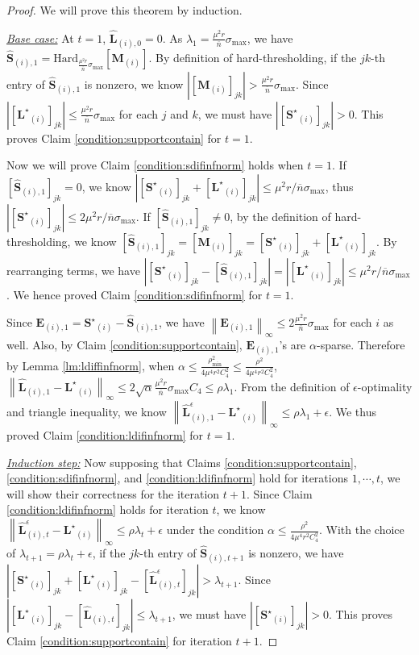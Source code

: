\documentclass[twoside,11pt]{article}
\newcommand{\abs}[1]{\left\vert #1\right\vert}
\newcommand{\norm}[1]{\left\lVert#1\right\rVert}
\newcommand{\hard}[2]{\text{Hard}_{#1}\left[#2\right]}
\newcommand{\matE}{\mathbf{E}}
\newcommand{\matLst}{{\mathbf{L}^\star}}
\newcommand{\matM}{\mathbf{M}}
\newcommand{\matSst}{{\mathbf{S}^\star}}
\newcommand{\hmatL}{\hat{\mathbf{L}}}
\newcommand{\hmatLeps}{\hat{\mathbf{L}}^{\epsilon}}
\newcommand{\hmatS}{\hat{\mathbf{S}}}
\newcommand{\gop}{\sigma_{\max}}
\newcommand{\bn}{{\overline{n}}}
\newcommand{\rhom}{\rho_{\min}}
\begin{document}
\begin{proof}
We will prove this theorem by induction.\vspace{1mm}

\noindent \underline{\it Base case:}
At $t=1$, $\hmatL_{(i),0}=0$. As $\lambda_1=\frac{\mu^2 r}{\bn}\gop$, we have  $\hmatS_{(i),1}=\hard{\frac{\mu^2 r}{\bn}\gop}{\matM_{(i)}}$. By definition of hard-thresholding, if the $jk$-th entry of $\hmatS_{(i),1}$ is nonzero, we know $\abs{[\matM_{(i)}]_{jk}}> \frac{\mu^2 r}{\bn}\gop$. Since $\abs{[\matLst_{(i)}]_{jk}}\le \frac{\mu^2 r}{\bn}\gop$ for each $j$ and $k$, we must have $\abs{[\matSst_{(i)}]_{jk}}>0$. This proves Claim \ref{condition:supportcontain} for $t=1$.

Now we will prove Claim \ref{condition:sdifinfnorm} holds when $t=1$. If $[\hmatS_{(i),1}]_{jk}= 0$, we know $\abs{[\matSst_{(i)}]_{jk}+[\matLst_{(i)}]_{jk}}\le \mu^2r/\bn \gop$, thus $\abs{[\matSst_{(i)}]_{jk}}\le 2\mu^2r/\bn \gop$. If $[\hmatS_{(i),1}]_{jk}\neq0$, by the definition of hard-thresholding, we know $[\hmatS_{(i),1}]_{jk}= [\matM_{(i)}]_{jk}= [\matSst_{(i)}]_{jk}+[\matLst_{(i)}]_{jk}$. By rearranging terms, we have $\abs{[\matSst_{(i)}]_{jk}-[\hmatS_{(i),1}]_{jk}}=\abs{[\matLst_{(i)}]_{jk}}\le \mu^2r/\bn \gop $. We hence proved Claim \ref{condition:sdifinfnorm} for $t=1$.

Since $\matE_{(i),1}=\matSst_{(i)}-\hmatS_{(i),1}$, we have $\norm{\matE_{(i),1}}_{\infty}\le 2\frac{\mu^2r}{\bn} \gop$ for each $i$ as well. Also, by Claim \ref{condition:supportcontain}, $\matE_{(i),1}$'s are $\alpha$-sparse. Therefore by Lemma \ref{lm:ldiffinfnorm}, when $\alpha \le \frac{\rhom^2}{4\mu^4r^2C_4^2}\le \frac{\rho^2}{4\mu^4r^2C_4^2} $, $\norm{\hmatL_{(i),1}-\matLst_{(i)}}_{\infty}\le 2\sqrt{\alpha}\frac{\mu^2 r}{\bn}\gop C_4\le \rho\lambda_1$. From the definition of $\epsilon$-optimality and triangle inequality, we know $\norm{\hmatLeps_{(i),1}-\matLst_{(i)}}_{\infty}\le \rho\lambda_1 + \epsilon$. We thus proved Claim \ref{condition:ldifinfnorm} for $t=1$.\vspace{1mm}

\noindent \underline{\it Induction step:}
Now supposing that Claims \ref{condition:supportcontain}, \ref{condition:sdifinfnorm}, and \ref{condition:ldifinfnorm} hold for iterations $1,\cdots,t$, we will show their correctness for the iteration $t+1$.
Since Claim \ref{condition:ldifinfnorm} holds for iteration $t$, we know$\norm{\hmatLeps_{(i),t}-\matLst_{(i)}}_{\infty}\le \rho \lambda_t + \epsilon $ under the condition $\alpha\le \frac{\rho^2}{4\mu^4 r^2 C_4^2 }$. With the choice of $\lambda_{t+1}=\rho \lambda_t+\epsilon$, if the $jk$-th entry of $\hmatS_{(i),t+1}$ is nonzero, we have $\abs{[\matSst_{(i)}]_{jk}+[\matLst_{(i)}]_{jk}-[\hmatLeps_{(i),t}]_{jk}}> \lambda_{t+1}$. Since $\abs{[\matLst_{(i)}]_{jk}-[\hmatL_{(i),t}]_{jk}}\le \lambda_{t+1}$, we must have $\abs{[\matSst_{(i)}]_{jk}}>0$. This proves Claim \ref{condition:supportcontain} for iteration $t+1$.


\end{proof}
\end{document}
